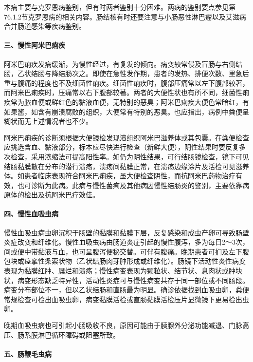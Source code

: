 本病主要与克罗恩病鉴别，但有时两者鉴别十分困难。两病的鉴别要点参见第76.1.2节克罗恩病的相关内容。肠结核有时还要注意与小肠恶性淋巴瘤以及艾滋病合并肠道感染等疾病鉴别。

\paragraph{三、慢性阿米巴痢疾}

阿米巴痢疾发病缓渐，为慢性经过，有复发的倾向。病变较常侵及盲肠与右侧结肠，乙状结肠与降结肠次之。即使在急性发作期，患者的发热、排便次数、里急后重与腹痛的程度也不及细菌性痢疾。细菌性痢疾时，腹部压痛常以左下腹部较著，而阿米巴痢疾时，压痛常以右下腹部较著。两者的大便性状也有所不同，细菌性痢疾常为脓血便或鲜红色的黏液血便，无特别的恶臭；阿米巴痢疾大便色常暗红，有如果酱，如含有崩溃腐败的组织，大便常有特别的恶臭。也应指出，病例中粪便呈糊状而无上述情况者也不少。

阿米巴痢疾的诊断须根据大便镜检发现溶组织阿米巴滋养体或其包囊。在粪便检查应挑选含血、黏液部分，标本应尽快进行检查（新鲜大便），阴性结果时要反复多次检查，采用浓缩法可提高阳性率。如仍为阴性结果，可行结肠镜检查，镜下可见结肠黏膜散在分布的潜行溃疡，溃疡间黏膜正常，在溃疡边缘涂片及活检可见滋养体。如患者临床表现符合阿米巴痢疾，虽大便检查阴性，而抗阿米巴药物治疗有效，也可诊断为此病。此病与慢性菌痢及其他病因慢性结肠炎的鉴别，主要依靠病原体的检出及抗阿米巴疗效佳。

\paragraph{四、慢性血吸虫病}

慢性血吸虫病虫卵沉积于肠壁的黏膜和黏膜下层，反复感染和成虫产卵可导致肠壁炎症改变和纤维化。慢性血吸虫病由肠道炎症引起的慢性腹泻，多为每日2～3次，间或便中带黏液与血，也可呈腹泻便秘交替。可伴有腹痛。晚期患者可扪及左下腹包块或痉挛性条索状物（乙状结肠肉芽肿形成或纤维化）。肠镜下活动性炎性病变表现为黏膜红肿、糜烂和溃疡；慢性病变表现为颗粒状、结节状、息肉状或肿块状，病变形态缺乏特异性，活动性炎症可与慢性病变共存于同一部位或不同肠段。病变分布部位不一，但以乙状结肠和直肠最为明显。确诊依据找到血吸虫卵，粪便常规检查可检出血吸虫卵，病变黏膜活检或直肠黏膜活检压片显微镜下更易检出虫卵。

晚期血吸虫病也可引起小肠吸收不良，原因可能由于胰腺外分泌功能减退、门脉高压、肠系膜淋巴循环障碍或阻塞所致。

\paragraph{五、肠鞭毛虫病}

